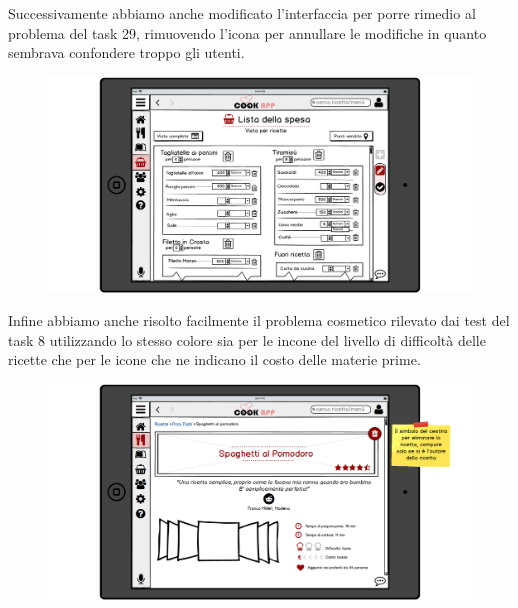 Successivamente abbiamo anche modificato l'interfaccia per porre rimedio al
problema del task 29, rimuovendo l'icona per annullare le modifiche in
quanto sembrava confondere troppo gli utenti.


\begin{figure}[H]
	\includegraphics[width=\linewidth]{img/mockup/spesa-edit-fixed.png}
\end{figure}


Infine abbiamo anche risolto facilmente il problema cosmetico 
rilevato dai test del task 8 utilizzando lo stesso colore sia per le
incone del
livello di difficoltà delle ricette che per le icone che ne indicano il
costo delle materie prime.

\begin{figure}[H]
	\includegraphics[width=\linewidth]{img/mockup/Ricetta-fixed.png}
\end{figure}
